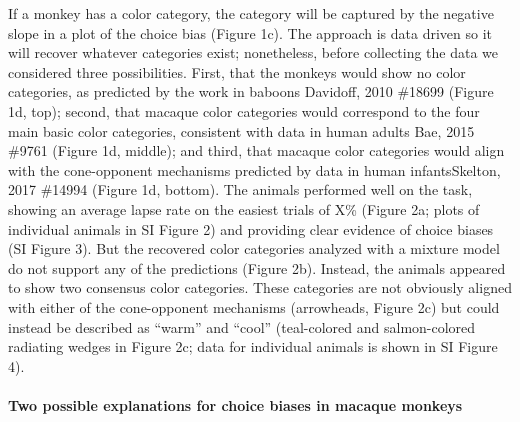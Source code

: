 If a monkey has a color category, the category will be captured by the negative slope in a plot of the choice bias (Figure 1c). 
The approach is data driven so it will recover whatever categories exist; nonetheless, before collecting the data we considered three possibilities. First, that the monkeys would show no color categories, as predicted by the work in baboons {Davidoff, 2010 \#18699} (Figure 1d, top); second, that macaque color categories would correspond to the four main basic color categories, consistent with data in human adults {Bae, 2015 \#9761} (Figure 1d, middle); and third, that macaque color categories would align with the cone-opponent mechanisms predicted by data in human infants{Skelton, 2017 \#14994} (Figure 1d, bottom). The animals performed well on the task, showing an average lapse rate on the easiest trials of X\% (Figure 2a; plots of individual animals in SI Figure 2) and providing clear evidence of choice biases (SI Figure 3). But the recovered color categories analyzed with a mixture model do not support any of the predictions (Figure 2b). Instead, the animals appeared to show two consensus color categories. These categories are not obviously aligned with either of the cone-opponent mechanisms (arrowheads, Figure 2c) but could instead be described as “warm” and “cool” (teal-colored and salmon-colored radiating wedges in Figure 2c; data for individual animals is shown in SI Figure 4).

\paragraph{Two possible explanations for choice biases in macaque monkeys}

